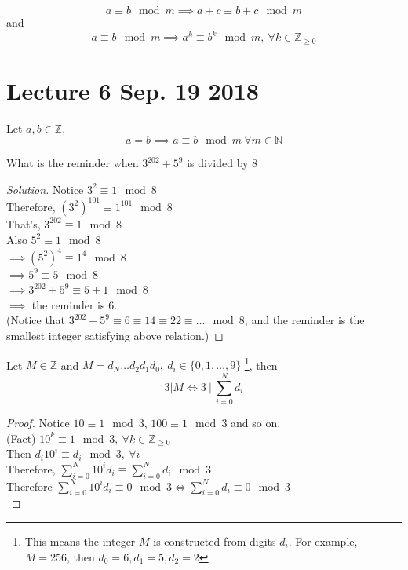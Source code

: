 \documentclass[11pt]{article}
\begin{document}
	\begin{proposition}
		\[
		a \equiv b \mod m \implies a + c \equiv b + c \mod m 
		\] and
		\[
			a \equiv b \mod m \implies a^k \equiv b^k \mod m,\ \forall k \in \mathbb{Z}_{\geq 0}
		\]
	\end{proposition}
	
	\section{Lecture 6 Sep. 19 2018}
	
	\begin{theorem}
		Let $a,b \in \mathbb{Z}$,
		\[
			a = b \implies a \equiv b \mod m\ \forall m \in \mathbb{N}
		\]
	\end{theorem}
	
	\begin{example}
		What is the reminder when $3^{202}+5^9$ is divided by 8		
		\begin{proof}[Solution]
			Notice $3^2 \equiv 1 \mod 8$ \\
			Therefore, $(3^2)^{101} \equiv 1^{101} \mod 8$ \\
			That's, $3^{202} \equiv 1 \mod 8$ \\
			Also $5^2 \equiv 1 \mod 8$ \\
			$\implies (5^2)^4 \equiv 1^4 \mod 8$ \\
			$\implies 5^9 \equiv 5 \mod 8$ \\
			$\implies 3^{202} + 5^9 \equiv 5 + 1 \mod 8$ \\
			$\implies$ the reminder is $6$. \\
			(Notice that $3^{202} + 5^9 \equiv 6 \equiv 14 \equiv 22 \equiv \dots \mod 8 $, and the reminder is the smallest integer satisfying above relation.)
		\end{proof}
	\end{example}
	
	\begin{theorem}
		Let $M \in \mathbb{Z}$ and $M = d_N \dots d_2 d_1 d_0,\ d_i \in \{0,1,\dots,9\}$ \footnote{This means the integer $M$ is constructed from digits $d_i$. For example, $M=256$, then $d_0=6, d_1=5,d_2=2$}, then
		\[
			3 | M \iff 3\ |\ \sum_{i=0}^N{d_i}
		\]
	\end{theorem}
	
	\begin{proof}
		Notice $10 \equiv 1 \mod 3$, $100 \equiv 1 \mod 3$ and so on, \\
		(Fact) $10^k \equiv 1 \mod 3,\ \forall k \in \mathbb{Z}_{\geq 0}$ \\
		Then $d_i 10^i \equiv d_i \mod 3,\ \forall i$ \\
		Therefore, $\sum_{i=0}^N{10^i d_i} \equiv \sum_{i=0}^N{d_i} \mod 3$ \\
		Therefore $\sum_{i=0}^N{10^i d_i} \equiv 0 \mod 3 \iff \sum_{i=0}^N{d_i} \equiv 0 \mod 3$ \\
	\end{proof}
		
\end{document}

